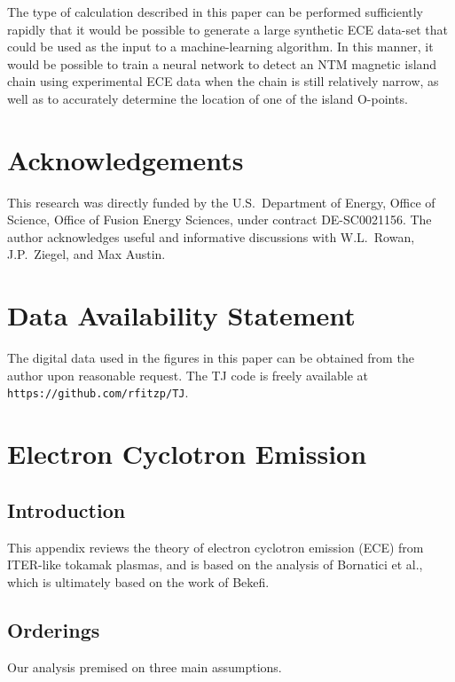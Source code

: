 \documentclass[12pt,prb,aps]{revtex4-1}
\begin{document}
The type of calculation described in this paper can be performed sufficiently rapidly that it would be possible to generate a large synthetic ECE data-set
that could be used as the input to a machine-learning algorithm. In this manner, it would be possible to train a neural network to  detect an NTM magnetic
island chain using experimental ECE data when the chain is still relatively narrow, as well as to accurately determine the location of one of the island O-points. 

\section*{Acknowledgements}
This research was directly funded by the U.S.\ Department of Energy, Office of Science, Office of Fusion Energy Sciences, under  contract DE-SC0021156. 
The author acknowledges useful and informative discussions with W.L.~Rowan, J.P.~Ziegel, and Max Austin.

\section*{Data Availability Statement}
The digital data used in the figures in this paper can be obtained from the author upon reasonable request. The TJ code is freely 
available at {\tt https://github.com/rfitzp/TJ}. 

\appendix
\section{Electron Cyclotron Emission}\label{sece}
\subsection{Introduction}
This appendix reviews the theory of electron cyclotron emission (ECE) from ITER-like tokamak plasmas, and is based on the analysis of Bornatici et al.,\cite{bornatici}
which is ultimately based on the work of Bekefi.\cite{bekefi}

\subsection{Orderings}
Our analysis premised on three main assumptions. 
\end{document}
